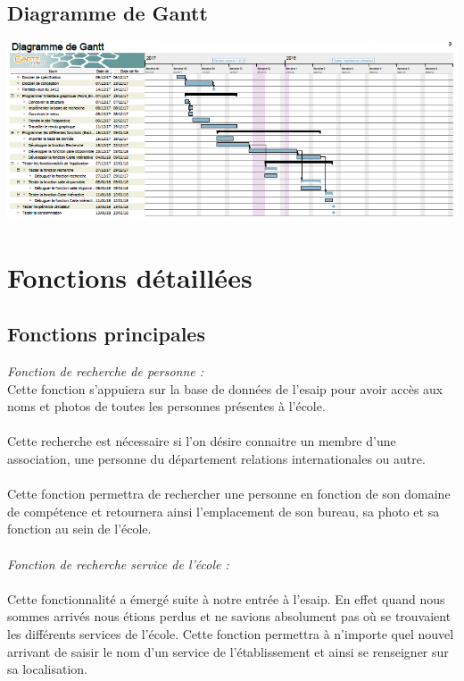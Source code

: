 \documentclass[11pt,a4paper]{report}
\begin{document}
		\section{Diagramme de Gantt}
		\begin{center}
			\includegraphics[angle=90,scale=1]{gantt}
		\end{center}
	\chapter{Fonctions détaillées}
		\section{Fonctions principales}
\emph{Fonction de recherche de personne :}\\

Cette fonction s'appuiera sur la base de données de l’esaip pour avoir accès aux noms et photos de toutes les personnes présentes à l’école.\\
\\
Cette recherche est nécessaire si l’on désire connaitre un membre d’une association, une personne du département relations internationales ou autre.\\
\\
Cette fonction permettra de rechercher une personne en fonction de son domaine de compétence et retournera ainsi l’emplacement de son bureau, sa photo et sa fonction au sein de l’école.\\
\\
\emph{Fonction de recherche service de l’école :}\\
\\Cette fonctionnalité a émergé suite à notre entrée à l’esaip. En effet quand nous sommes arrivés nous étions perdus et ne savions absolument pas où se trouvaient les différents services de l’école. Cette fonction permettra à n’importe quel nouvel arrivant de saisir le nom d’un service de l’établissement et ainsi se renseigner sur sa localisation.\\
\end{document}
